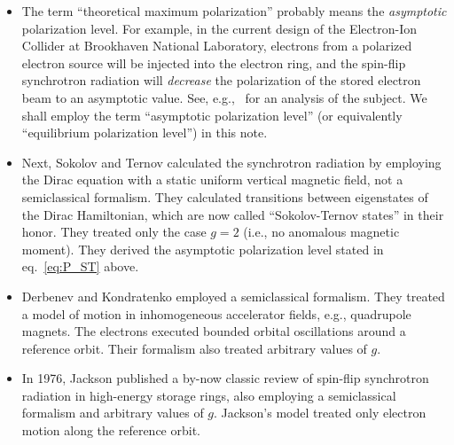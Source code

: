 \documentclass[review]{elsarticle}
\theoremstyle{plain}
\begin{document}
\begin{itemize}
\item
The term ``theoretical maximum polarization'' probably means the \emph{asymptotic} polarization level.
For example, in the current design of the Electron-Ion Collider at Brookhaven National Laboratory,
electrons from a polarized electron source will be injected into the electron ring,
and the spin-flip synchrotron radiation will \emph{decrease} the polarization of the stored electron beam to an asymptotic value.
See, e.g.,~\cite{SH_BAGELS2} for an analysis of the subject.
We shall employ the term ``asymptotic polarization level'' (or equivalently ``equilibrium polarization level'') in this note.
\item
Next, Sokolov and Ternov \cite{ST} calculated the synchrotron radiation by employing the Dirac equation with a static uniform vertical magnetic field,
not a semiclassical formalism.
They calculated transitions between eigenstates of the Dirac Hamiltonian, which are now called ``Sokolov-Ternov states'' in their honor.
They treated only the case $g=2$ (i.e., no anomalous magnetic moment).
They derived the asymptotic polarization level stated in eq.~\eqref{eq:P_ST} above.
\item
Derbenev and Kondratenko \cite{DK73} employed a semiclassical formalism.
They treated a model of motion in inhomogeneous accelerator fields, e.g., quadrupole magnets.
The electrons executed bounded orbital oscillations around a reference orbit.
Their formalism also treated arbitrary values of $g$.
\item
In 1976, Jackson \cite{JacksonRMP} published a by-now classic review of spin-flip synchrotron radiation in high-energy storage rings,
also employing a semiclassical formalism and arbitrary values of $g$.
Jackson's model treated only electron motion along the reference orbit.
\end{itemize}

\setcounter{equation}{0}
\end{document}
